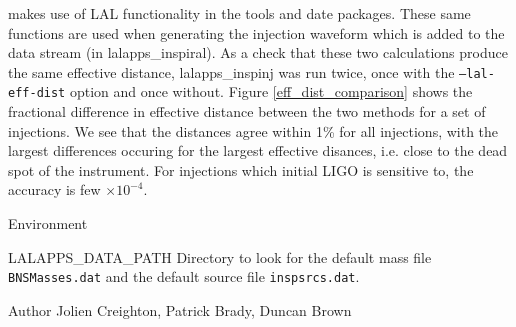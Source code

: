 \begin{entry}
makes use of LAL functionality in the tools and date packages.  These same
functions are used when generating the injection waveform which is added to
the data stream (in lalapps\_inspiral).  As a check that these two
calculations produce the same effective distance, lalapps\_inspinj was run
twice, once with the \texttt{--lal-eff-dist} option and once without.  Figure
\ref{eff_dist_comparison} shows the fractional difference in effective
distance between the two methods for a set of injections.  We see that the
distances agree within 1\% for all injections, with the largest differences
occuring for the largest effective disances, i.e.  close to the dead spot of
the instrument.  For injections which initial LIGO is sensitive to, the
accuracy is few $\times 10^{-4}$.  

\item[Environment]\leavevmode
\begin{entry}
\item[LALAPPS\_DATA\_PATH] Directory to look for the default mass
file \verb+BNSMasses.dat+ and the default source file \verb+inspsrcs.dat+.
\end{entry}


\item[Author] 
Jolien Creighton, Patrick Brady, Duncan Brown
\end{entry}


